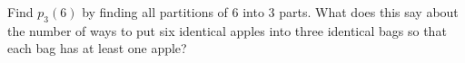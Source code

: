 \documentclass{book}
\begin{document}
\setcounter{project}{208}
\addtocounter{project}{-1}
\begin{activity}[]\label{activity-201}
\hypertarget{p-1165}{}%
Find \(p_3(6)\) by finding all partitions of 6 into 3 parts. What does this say about the number of ways to put six identical apples into three identical bags so that each bag has at least one apple?%
\end{activity}
\end{document}
